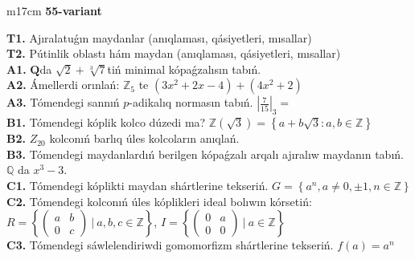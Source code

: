 \documentclass{article}
\begin{document}
\begin{tabular}{m{17cm}}
\textbf{55-variant}
\newline

\textbf{T1.} Ajıralatuǵın maydanlar (anıqlaması, qásiyetleri, mısallar) \\
\textbf{T2.} Pútinlik oblastı hám maydan (anıqlaması, qásiyetleri, mısallar) \\
\textbf{A1.} \(\mathbf{Q}\)da \(\sqrt{2} + \sqrt[3]{7}\)tiń minimal kópaǵzalısın tabıń. \\
\textbf{A2.} Ámellerdi orınlań: \(\mathbb{Z}_{5}\) te \(\left( 3x^{2} + 2x - 4 \right) + \left( 4x^{2} + 2 \right)\) \\
\textbf{A3.} Tómendegi sannıń \(p\)-adikalıq normasın tabıń. \(|\frac{7}{15}|_{3} =\) \\
\textbf{B1.} Tómendegi kóplik kolco dúzedi ma? \(\mathbb{Z}\left( \sqrt{3} \right) = \left\{ a + b\sqrt{3}:a,b \in \mathbb{Z} \right\}\) \\
\textbf{B2.} \(Z_{20}\) kolconıń barlıq úles kolcoların anıqlań. \\
\textbf{B3.} Tómendegi maydanlardıń berilgen kópaǵzalı arqalı ajıralıw maydanın tabıń. \(\mathbb{Q}\) da \(x^{3} - 3\). \\
\textbf{C1.} Tómendegi kóplikti maydan shártlerine tekseriń. \(G = \left\{ a^{n},a \neq 0, \pm 1,n \in \mathbb{Z} \right\}\) \\
\textbf{C2.} Tómendegi kolconıń úles kóplikleri ideal bolıwın kórsetiń:
\(R = \left\{ \begin{pmatrix}
a & b \\
0 & c
\end{pmatrix}\ |\ a,b,c \in \mathbb{Z} \right\}\), \(I = \left\{ \begin{pmatrix}
0 & a \\
0 & 0
\end{pmatrix}\ |\ a \in \mathbb{Z} \right\}\) \\
\textbf{C3.} Tómendegi sáwlelendiriwdi gomomorfizm shártlerine tekseriń. \(f(a) = a^{n}\) \\

\end{tabular}
\vspace{1cm}
\end{document}
